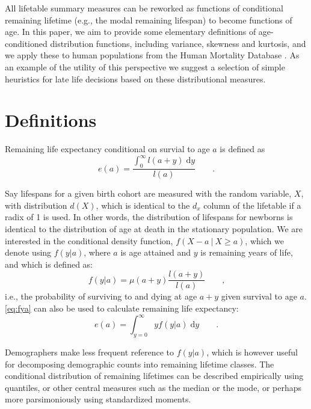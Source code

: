 \documentclass{article}
\newcommand{\dd}{\; \mathrm{d}}
\newcommand{\tc}{\quad\quad\text{,}}
\newcommand{\tp}{\quad\quad\text{.}}
\begin{document}
All lifetable
summary measures can be reworked as functions of conditional remaining lifetime
(e.g., the modal remaining lifespan) to become functions of age.
In this paper, we aim to provide some elementary definitions of age-conditioned
distribution functions, including variance, skewness and kurtosis, and we apply
these to human populations from the Human Mortality Database .
As an example of the utility of this perspective we suggest a selection of
simple heuristics for late life decisions based on these distributional measures.

\section*{Definitions}

Remaining life expectancy conditional on survial to age $a$ is defined as
\begin{equation}
e(a) = \frac{\int_0^\infty l(a+y) \dd y}{l(a)} \tp
\end{equation}

Say lifespans for a given birth cohort are measured with the random variable,
$X$, with distribution $d(X)$, which is identical to the $d_x$
column of the lifetable if a radix of 1 is used. In other words, the
distribution of lifespans for newborns is identical to the distribution of
age at death in the stationary population. We are interested in the
conditional density function, $f(X-a ~|~ X \ge a)$, which we denote using
$f(y|a)$, where $a$ is age attained and $y$ is remaining years of life, and
which is defined as:
\begin{equation}
\label{eq:fya}
f(y|a) = \mu(a+y) \frac{l(a+y)}{l(a)} \tc
\end{equation}
i.e., the probability of surviving to and dying at age $a+y$ given survival to
age $a$. \eqref{eq:fya} can also be used to calculate remaining life expectancy:
\begin{equation}
e(a) = \int _{y=0}^\infty y f(y|a) \dd y \tp
\end{equation}

Demographers make less frequent
reference to $f(y|a)$, which is however useful for decomposing
demographic counts into remaining lifetime classes. The conditional distribution of remaining lifetimes can be
described empirically using quantiles, or other central measures such as the
median or the mode, or perhaps more parsimoniously using standardized moments.
\end{document}
